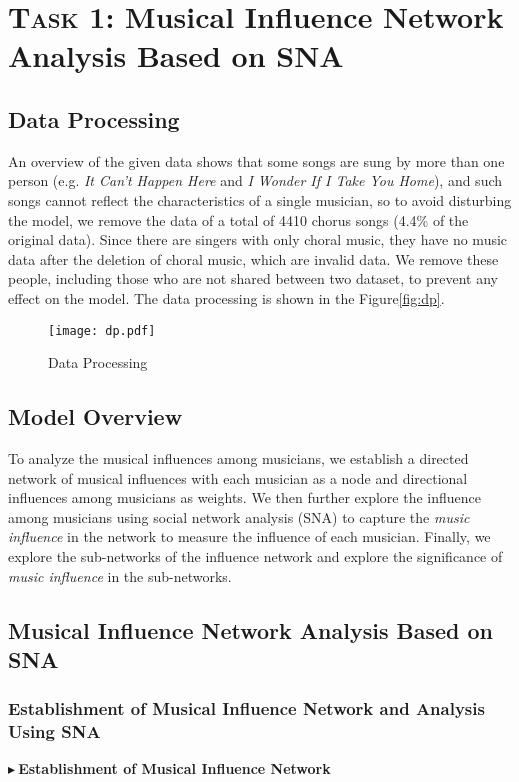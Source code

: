 \documentclass[12pt]{article}  %
\begin{document}
\section{\textsc{Task 1}: Musical Influence Network Analysis Based on SNA}
\vspace{-0.5cm}
\subsection{Data Processing}
\vspace{-0.3cm}
An overview of the given data shows that some songs are sung by more than one person (e.g. \emph{It Can't Happen Here} and \emph{I Wonder If I Take You Home}), and such songs cannot reflect the characteristics of a single musician, so to avoid disturbing the model, we remove the data of a total of 4410 chorus songs (4.4\% of the original data). Since there are singers with only choral music, they have no music data after the deletion of choral music, which are invalid data. We remove these people, including those who are not shared between two dataset, to prevent any effect on the model. The data processing is shown in the Figure\eqref{fig:dp}.
\vspace{-0.3cm}
\begin{figure}[htbp]
	\centering
	\texttt{[image: dp.pdf]}
	\caption{Data Processing}\label{fig:dp}
\end{figure}
\vspace{-0.8cm}
\subsection{Model Overview}
To analyze the musical influences among musicians, we establish a directed network of musical influences with each musician as a node and directional influences among musicians as weights. We then further explore the influence among musicians using social network analysis (SNA) to capture the \emph{music influence} in the network to measure the influence of each musician. Finally, we explore the sub-networks of the influence network and explore the significance of \emph{music influence} in the sub-networks.
\vspace{-0.5cm}
\subsection{Musical Influence Network Analysis Based on SNA}
\vspace{-0.2cm}
\subsubsection{Establishment of Musical Influence Network and Analysis Using SNA}
\noindent$\blacktriangleright\ $\textbf{\large{Establishment of Musical Influence Network}}
\end{document}
